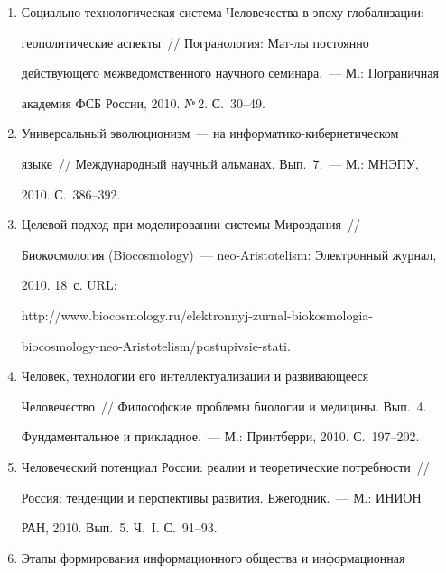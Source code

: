 \begin{enumerate}[1.]
время, 2010. №\,2. С.~43--54.


\item {}


Социально-технологическая сис\-тема Человечества в эпоху глобализации: 


геополитические аспекты~/\!\!/  Погранология: Мат-лы постоянно 


действующего межведомственного научного семинара.~--- М.: Пограничная 


академия ФСБ России, 2010. №\,2. С.~30--49.


\item {}


Универсальный эволюционизм~--- на информатико-ки\-бер\-не\-ти\-че\-ском 


языке~/\!\!/  Международный научный альманах. Вып.~7.~--- М.: МНЭПУ, 


2010. С.~386--392.


\item {}


Целевой подход при моделировании сис\-темы Мироздания~/\!\!/  


Биокосмология (Biocosmology)~--- neo-Aristotelism: Электронный журнал, 


2010. 18~с. URL: 


{\sf http://www.biocosmology.ru/elektronnyj-zurnal-biokosmologia-


biocosmology-neo-Aristotelism/postupivsie-stati.}


\item {}


Человек, технологии его интеллектуализации и развивающееся 


Человечество~/\!\!/  Философские проблемы биологии и медицины. Вып.~4. 


Фундаментальное и прикладное.~--- М.: Принтберри, 2010. С.~197--202.


\item {}


Человеческий потенциал России: реалии и теоретические потребности~/\!\!/  


Россия: тенденции и перспективы развития. Ежегодник.~--- М.: ИНИОН 


РАН, 2010. Вып.~5. Ч.~I. С.~91--93.


\item {}


Этапы формирования информационного общества и информационная 



\end{enumerate}
